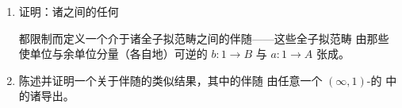 \begin{exercise}\label{ex:adjunction-restricts-adjoint-equivalence}
\begin{enumerate}[label=(\roman*)]
\item 证明：诸\trQuasiCategory{}之间的任何\trAdjunction
\begin{center}
\end{center}
都限制而定义一个介于诸全子拟范畴之间的伴随\trEquivalence——这些全子拟范畴
由那些使单位与余单位分量（各自地）可逆的\trElement{} $b\colon 1\to B$ 与
$a\colon 1\to A$ 张成。
\item 陈述并证明一个关于伴随\trEquivalence{}的类似结果，其中的伴随%
\trEquivalence{}由任意一个 $(\infty,1)$-\trCategory{}的\trInfinityCosmos{}%
中的诸\trAdjunction{}导出。
\end{enumerate}
\end{exercise}

